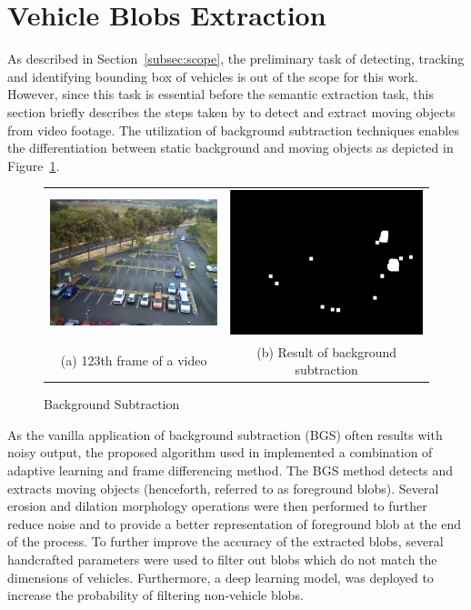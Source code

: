 \section{Vehicle Blobs Extraction}
\label{subsection:fundamental}

As described in Section~\ref{subsec:scope}, the preliminary task of detecting, tracking and identifying bounding box of vehicles is out of the scope for this work. However, since this task is essential before the semantic extraction task, this section briefly describes the steps taken by  to detect and extract moving objects from video footage. The utilization of background subtraction techniques enables the differentiation between static background and moving objects as depicted in Figure~\ref{fig:bgs}.

\begin{figure}[htb!]
  \centering
  \begin{tabular}{cc}
  \includegraphics[width=0.4\linewidth]{image/general/bgs1.png} &
  \includegraphics[width=0.4\linewidth]{image/general/bgs2.png}  \\
  (a) 123th frame of a video & (b) Result of background subtraction \\
  \end{tabular}
  \caption{Background Subtraction}
  \label{fig:bgs}
\end{figure}

As the vanilla application of background subtraction (BGS) often results with noisy output, the proposed algorithm used in \cite{lim2017} implemented a combination of adaptive learning and frame differencing method. The BGS method detects and extracts moving objects (henceforth, referred to as foreground blobs).
Several erosion and dilation morphology operations were then performed to further reduce noise and to provide a better representation of foreground blob at the end of the process.
To further improve the accuracy of the extracted blobs, several handcrafted parameters were used to filter out blobs which do not match the dimensions of vehicles.
Furthermore, a deep learning model, was deployed to increase the probability of filtering non-vehicle blobs.


